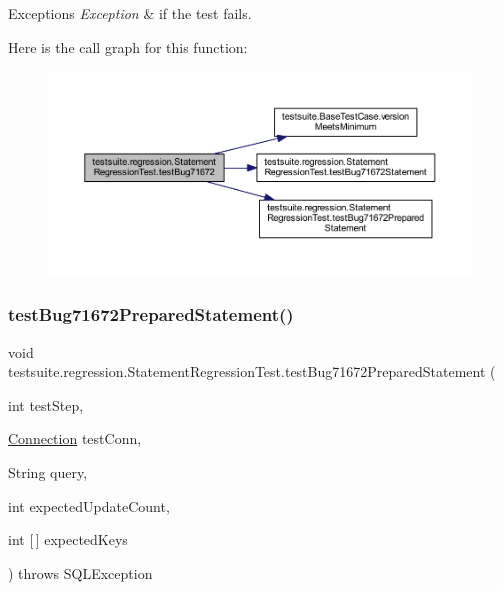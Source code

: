 \begin{DoxyExceptions}{Exceptions}
{\em Exception} & if the test fails. \\
\hline
\end{DoxyExceptions}
Here is the call graph for this function\+:
\nopagebreak
\begin{figure}[H]
\begin{center}
\leavevmode
\includegraphics[width=350pt]{classtestsuite_1_1regression_1_1_statement_regression_test_ab1d12cefc8598fc6b119554ddfe01866_cgraph}
\end{center}
\end{figure}
\mbox{\label{classtestsuite_1_1regression_1_1_statement_regression_test_ac89b52220f4a7d1e808940f72f5887c1}} 
\subsubsection{\texorpdfstring{test\+Bug71672\+Prepared\+Statement()}{testBug71672PreparedStatement()}}
{\footnotesize\ttfamily void testsuite.\+regression.\+Statement\+Regression\+Test.\+test\+Bug71672\+Prepared\+Statement (\begin{DoxyParamCaption}\item[{int}]{test\+Step,  }\item[{\mbox{\hyperlink{interfacecom_1_1mysql_1_1jdbc_1_1_connection}{Connection}}}]{test\+Conn,  }\item[{String}]{query,  }\item[{int}]{expected\+Update\+Count,  }\item[{int \mbox{[}$\,$\mbox{]}}]{expected\+Keys }\end{DoxyParamCaption}) throws S\+Q\+L\+Exception}

